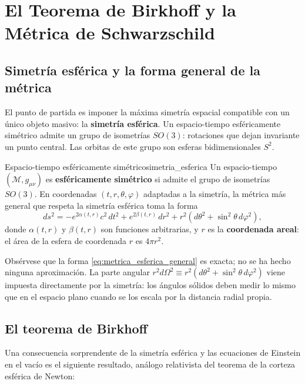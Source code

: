 \section{El Teorema de Birkhoff y la Métrica de Schwarzschild}
\label{sec:birkhoff}

\subsection{Simetría esférica y la forma general de la métrica}

El punto de partida es imponer la máxima simetría espacial compatible con un único objeto masivo: la \textbf{simetría esférica}. Un espacio-tiempo esféricamente simétrico admite un grupo de isometrías $SO(3)$: rotaciones que dejan invariante un punto central. Las orbitas de este grupo son esferas bidimensionales $S^2$.

\begin{definicion}{Espacio-tiempo esféricamente simétrico}{simetria_esferica}
Un espacio-tiempo $(\mathcal{M}, g_{\mu\nu})$ es \textbf{esféricamente simétrico} si admite el grupo de isometrías $SO(3)$. En coordenadas $(t, r, \theta, \varphi)$ adaptadas a la simetría, la métrica más general que respeta la simetría esférica toma la forma
\begin{equation}
  ds^2 = -e^{2\alpha(t,r)}c^2\,dt^2 + e^{2\beta(t,r)}\,dr^2
         + r^2\!\left(d\theta^2 + \sin^2\!\theta\,d\varphi^2\right),
  \label{eq:metrica_esferica_general}
\end{equation}
donde $\alpha(t,r)$ y $\beta(t,r)$ son funciones arbitrarias, y $r$ es la \textbf{coordenada areal}: el área de la esfera de coordenada $r$ es $4\pi r^2$.
\end{definicion}

Obsérvese que la forma \eqref{eq:metrica_esferica_general} es exacta; no se ha hecho ninguna aproximación. La parte angular $r^2 d\Omega^2 \equiv r^2(d\theta^2 + \sin^2\!\theta\,d\varphi^2)$ viene impuesta directamente por la simetría: los ángulos sólidos deben medir lo mismo que en el espacio plano cuando se los escala por la distancia radial propia.

\subsection{El teorema de Birkhoff}

Una consecuencia sorprendente de la simetría esférica y las ecuaciones de Einstein en el vacío es el siguiente resultado, análogo relativista del teorema de la corteza esférica de Newton:

